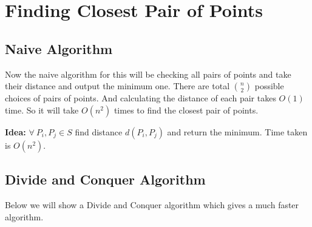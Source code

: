 \chapter{Finding Closest Pair of Points}
\begin{algoprob}
\end{algoprob}

\section{Naive Algorithm}

Now the naive algorithm for this will be checking all pairs of points and take their distance and output the minimum one. There are total $\binom{n }{2}$ possible choices of pairs of points. And calculating the distance of each pair takes $O(1)$ time. So it will take $O(n^2)$ times to find the closest pair of points. \parinf

\textbf{Idea:} $\forall\ P_i,P_j\in S$ find distance $d(P_i,P_j)$ and return the minimum. Time taken is $O(n^2)$.

\section{Divide and Conquer Algorithm}
Below we will show a Divide and Conquer algorithm which gives a much faster algorithm.


